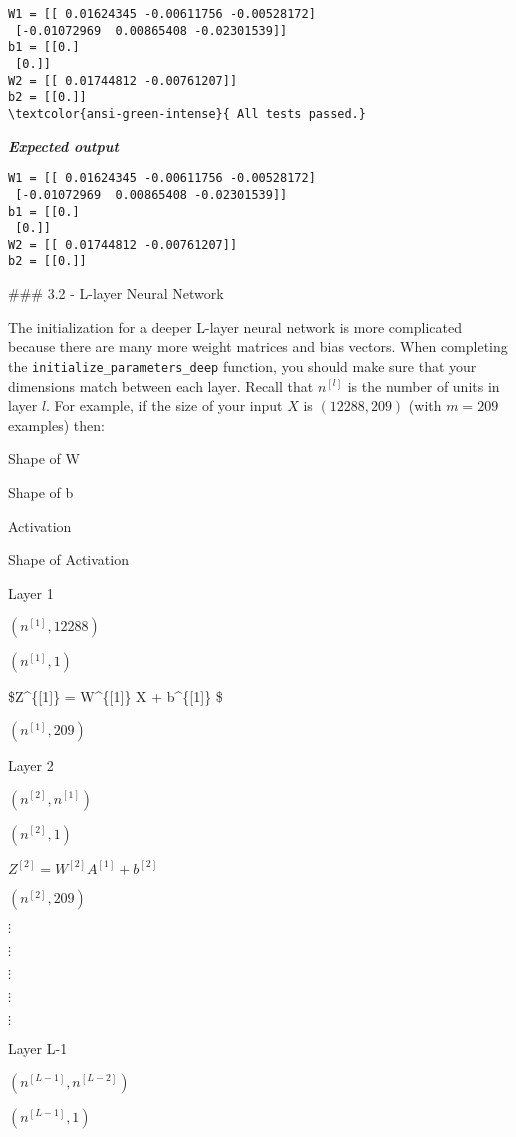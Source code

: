 \documentclass[11pt]{article}
\begin{document}
    \begin{Verbatim}[commandchars=\\\{\}]
W1 = [[ 0.01624345 -0.00611756 -0.00528172]
 [-0.01072969  0.00865408 -0.02301539]]
b1 = [[0.]
 [0.]]
W2 = [[ 0.01744812 -0.00761207]]
b2 = [[0.]]
\textcolor{ansi-green-intense}{ All tests passed.}
    \end{Verbatim}

    \textbf{\emph{Expected output}}

\begin{verbatim}
W1 = [[ 0.01624345 -0.00611756 -0.00528172]
 [-0.01072969  0.00865408 -0.02301539]]
b1 = [[0.]
 [0.]]
W2 = [[ 0.01744812 -0.00761207]]
b2 = [[0.]]
\end{verbatim}

    \#\#\# 3.2 - L-layer Neural Network

The initialization for a deeper L-layer neural network is more
complicated because there are many more weight matrices and bias
vectors. When completing the \texttt{initialize\_parameters\_deep}
function, you should make sure that your dimensions match between each
layer. Recall that \(n^{[l]}\) is the number of units in layer \(l\).
For example, if the size of your input \(X\) is \((12288, 209)\) (with
\(m=209\) examples) then:

Shape of W

Shape of b

Activation

Shape of Activation

Layer 1

\((n^{[1]},12288)\)

\((n^{[1]},1)\)

\$Z\^{}\{{[}1{]}\} = W\^{}\{{[}1{]}\} X + b\^{}\{{[}1{]}\} \$

\((n^{[1]},209)\)

Layer 2

\((n^{[2]}, n^{[1]})\)

\((n^{[2]},1)\)

\(Z^{[2]} = W^{[2]} A^{[1]} + b^{[2]}\)

\((n^{[2]}, 209)\)

\(\vdots\)

\(\vdots\)

\(\vdots\)

\(\vdots\)

\(\vdots\)

Layer L-1

\((n^{[L-1]}, n^{[L-2]})\)

\((n^{[L-1]}, 1)\)
\end{document}
